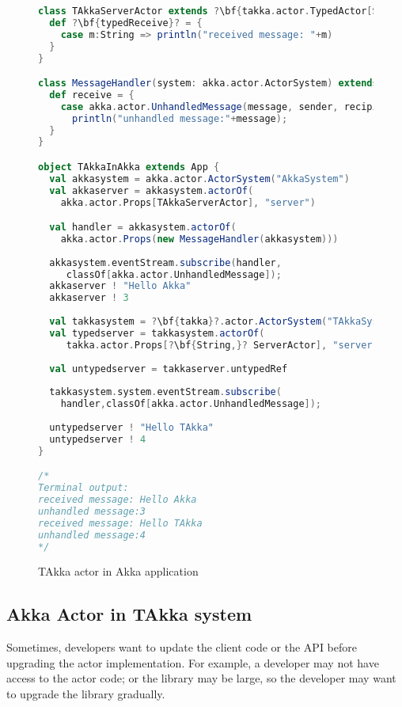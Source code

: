 \begin{figure}
\label{takkaINakka}
      \begin{lstlisting}[language=scala, escapechar=?]
class TAkkaServerActor extends ?\bf{takka.actor.TypedActor[String]}? {
  def ?\bf{typedReceive}? = {
    case m:String => println("received message: "+m)
  }
}

class MessageHandler(system: akka.actor.ActorSystem) extends akka.actor.Actor {
  def receive = {
    case akka.actor.UnhandledMessage(message, sender, recipient) =>
      println("unhandled message:"+message);
  }
}

object TAkkaInAkka extends App {
  val akkasystem = akka.actor.ActorSystem("AkkaSystem")
  val akkaserver = akkasystem.actorOf(
    akka.actor.Props[TAkkaServerActor], "server")

  val handler = akkasystem.actorOf(
    akka.actor.Props(new MessageHandler(akkasystem)))
  
  akkasystem.eventStream.subscribe(handler,
     classOf[akka.actor.UnhandledMessage]);
  akkaserver ! "Hello Akka"
  akkaserver ! 3
  
  val takkasystem = ?\bf{takka}?.actor.ActorSystem("TAkkaSystem")
  val typedserver = takkasystem.actorOf(
     takka.actor.Props[?\bf{String,}? ServerActor], "server")
  
  val untypedserver = takkaserver.untypedRef
  
  takkasystem.system.eventStream.subscribe(
    handler,classOf[akka.actor.UnhandledMessage]);
  
  untypedserver ! "Hello TAkka"
  untypedserver ! 4
}

/*
Terminal output:
received message: Hello Akka
unhandled message:3
received message: Hello TAkka
unhandled message:4
*/
    \end{lstlisting}
    \caption{TAkka actor in Akka application}
\end{figure}



\subsection{Akka Actor in TAkka system}

Sometimes, developers want to update the client code or the API before upgrading 
the actor implementation. For example, a developer may not have access to 
the actor code; or the library may be large, so the developer may want to 
upgrade the library gradually.

